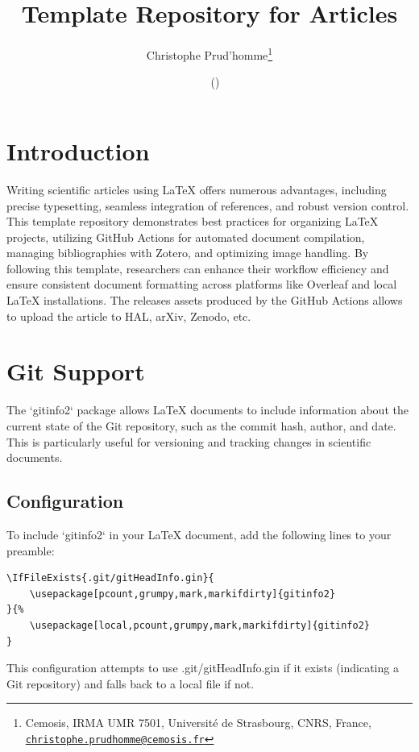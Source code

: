 \documentclass[a4paper]{article}
\title{Template Repository for Articles}
\author{Christophe Prud'homme\thanks{Cemosis, IRMA UMR 7501, Université de Strasbourg, CNRS, France, \tt \href{mailto:christophe.prudhomme@cemosis.fr}{christophe.prudhomme@cemosis.fr}}}
\date{\gitReln\  \gitAuthorDate\ (\gitAbbrevHash)}
\begin{document}
\maketitle
\tableofcontents

\section{Introduction}
\label{sec:introduction}

Writing scientific articles using LaTeX offers numerous advantages, including precise typesetting, seamless integration of references, and robust version control. 
This template repository demonstrates best practices for organizing LaTeX projects, utilizing GitHub Actions for automated document compilation, managing bibliographies with Zotero, and optimizing image handling. 
By following this template, researchers can enhance their workflow efficiency and ensure consistent document formatting across platforms like Overleaf and local LaTeX installations.
The releases assets produced by the GitHub Actions allows to upload the article to HAL, arXiv, Zenodo, etc.

\section{Git Support}
\label{sec:git-support}

The `gitinfo2` package allows LaTeX documents to include information about the current state of the Git repository, such as the commit hash, author, and date. This is particularly useful for versioning and tracking changes in scientific documents.

\subsection{Configuration}

To include `gitinfo2` in your LaTeX document, add the following lines to your preamble:

\begin{verbatim}
\IfFileExists{.git/gitHeadInfo.gin}{
    \usepackage[pcount,grumpy,mark,markifdirty]{gitinfo2}
}{%
    \usepackage[local,pcount,grumpy,mark,markifdirty]{gitinfo2}
}
\end{verbatim}

This configuration attempts to use .git/gitHeadInfo.gin if it exists (indicating a Git repository) and falls back to a local file if not.
\end{document}
